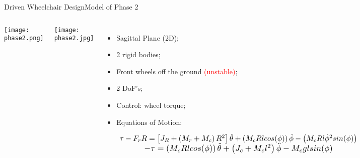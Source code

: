 \documentclass[10pt]{beamer}
\begin{document}
\begin{frame}{Driven Wheelchair Design}{Model of Phase 2}
\begin{columns}
\begin{minipage}[c][0.4\textheight][c]{\linewidth}
  \centering
  \texttt{[image: phase2.png]}
\end{minipage}
\begin{minipage}[c][0.4\textheight][c]{\linewidth}
  \centering
  \texttt{[image: phase2.jpg]}
\end{minipage}
\begin{minipage}[c][0.4\textheight][c]{\linewidth}
  \begin{itemize}
  \item Sagittal Plane (2D);
  \item 2 rigid bodies;
  \item Front wheels off the ground \textcolor{red}{(unstable)};
  \item 2 DoF's; 
  \item Control: wheel torque;
  \item Equations of Motion:

\begin{eqnarray*}
  \begin{matrix}
  \resizebox{1\textwidth}{!} 
{
    $ \tau - F_rR = \left[J_R + \left(M_r + M_c \right)R^2 \right]\ddot{\theta} + \left(M_cRlcos(\phi) \right)\ddot{\phi} - \left(M_cRl\dot{\phi}^2sin(\phi) \right) $
} 
\\
  \resizebox{.8 \textwidth}{!}%
{
    $ -\tau = \left( M_c Rl cos(\phi)\right)\ddot{\theta} + \left(J_c+M_cl^2 \right)\ddot{\phi} -M_cglsin(\phi) $
}   
  \end{matrix}
  \end{eqnarray*}
  
  \end{itemize}
\end{minipage}
\end{columns}
\end{frame}
\end{document}
